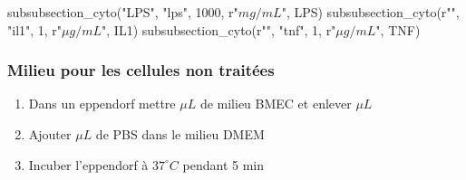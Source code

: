 \begin{pycode}
subsubsection_cyto("LPS", "lps", 1000, r"$mg/mL$", LPS)
subsubsection_cyto(r"\IL", "il1", 1, r"$\mu g/mL$", IL1)
subsubsection_cyto(r"\TNF", "tnf", 1, r"$\mu g/mL$", TNF)
\end{pycode}

\subsubsection{Milieu pour les cellules non traitées}

\begin{enumerate}
\item Dans un eppendorf mettre  $\mu L$ de milieu BMEC et enlever  $\mu L$
\item Ajouter  $\mu L$ de PBS dans le milieu DMEM
\item Incuber l'eppendorf à $37^\circ C$ pendant 5 min
\end{enumerate}